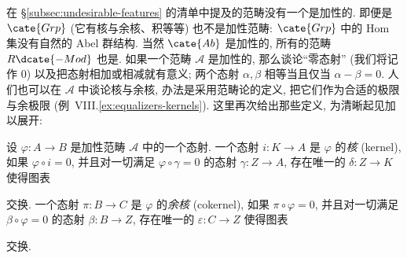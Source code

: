 \indent 在 \S\ref{subsec:undesirable-features} 的清单中提及的范畴没有一个是加性的. 即便是 $\cate{Grp}$ (它有核与余核、积等等) 也不是加性范畴: $\cate{Grp}$ 中的 Hom 集没有自然的 Abel 群结构. 当然 $\cate{Ab}$ 是加性的, 所有的范畴 $R\dcate{-Mod}$ 也是.
如果一个范畴 $\mathcal{A}$ 是加性的, 那么谈论``零态射'' (我们将记作 $0$) 以及把态射相加或相减就有意义; 两个态射 $\alpha,\beta$ 相等当且仅当 $\alpha-\beta=0$. 人们也可以在 $\mathcal{A}$ 中谈论核与余核, 办法是采用范畴论的定义, 把它们作为合适的极限与余极限 (例~VIII.\ref{ex:equalizers-kernels}). 这里再次给出那些定义, 为清晰起见加以展开:

\begin{definition}\label{def:kernel-cokernel}
设 $\varphi:A\to B$ 是加性范畴 $\mathcal{A}$ 中的一个态射. 一个态射 $i:K\to A$ 是 $\varphi$ 的\emph{核} (kernel), 如果 $\varphi\circ i=0$, 并且对一切满足 $\varphi\circ\gamma=0$ 的态射 $\gamma:Z\to A$, 存在唯一的 $\delta:Z\to K$ 使得图表
\begin{center}
\end{center}
交换. 一个态射 $\pi:B\to C$ 是 $\varphi$ 的\emph{余核} (cokernel), 如果 $\pi\circ\varphi=0$, 并且对一切满足 $\beta\circ\varphi=0$ 的态射 $\beta:B\to Z$, 存在唯一的 $\varepsilon:C\to Z$ 使得图表
\begin{center}
\end{center}
交换.
\end{definition}

